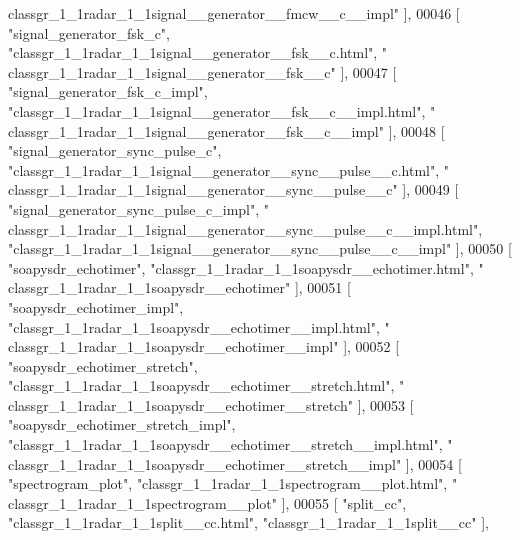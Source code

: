\begin{DoxyCode}
{      classgr\_1\_1radar\_1\_1signal\_\_generator\_\_fmcw\_\_c\_\_impl"} ],
00046     [ \textcolor{stringliteral}{"signal\_generator\_fsk\_c"}, \textcolor{stringliteral}{"classgr\_1\_1radar\_1\_1signal\_\_generator\_\_fsk\_\_c.html"}, \textcolor{stringliteral}{"
      classgr\_1\_1radar\_1\_1signal\_\_generator\_\_fsk\_\_c"} ],
00047     [ \textcolor{stringliteral}{"signal\_generator\_fsk\_c\_impl"}, \textcolor{stringliteral}{"classgr\_1\_1radar\_1\_1signal\_\_generator\_\_fsk\_\_c\_\_impl.html"}, \textcolor{stringliteral}{"
      classgr\_1\_1radar\_1\_1signal\_\_generator\_\_fsk\_\_c\_\_impl"} ],
00048     [ \textcolor{stringliteral}{"signal\_generator\_sync\_pulse\_c"}, \textcolor{stringliteral}{"classgr\_1\_1radar\_1\_1signal\_\_generator\_\_sync\_\_pulse\_\_c.html"}, \textcolor{stringliteral}{"
      classgr\_1\_1radar\_1\_1signal\_\_generator\_\_sync\_\_pulse\_\_c"} ],
00049     [ \textcolor{stringliteral}{"signal\_generator\_sync\_pulse\_c\_impl"}, \textcolor{stringliteral}{"
      classgr\_1\_1radar\_1\_1signal\_\_generator\_\_sync\_\_pulse\_\_c\_\_impl.html"}, \textcolor{stringliteral}{"classgr\_1\_1radar\_1\_1signal\_\_generator\_\_sync\_\_pulse\_\_c\_\_impl"} ],
00050     [ \textcolor{stringliteral}{"soapysdr\_echotimer"}, \textcolor{stringliteral}{"classgr\_1\_1radar\_1\_1soapysdr\_\_echotimer.html"}, \textcolor{stringliteral}{"
      classgr\_1\_1radar\_1\_1soapysdr\_\_echotimer"} ],
00051     [ \textcolor{stringliteral}{"soapysdr\_echotimer\_impl"}, \textcolor{stringliteral}{"classgr\_1\_1radar\_1\_1soapysdr\_\_echotimer\_\_impl.html"}, \textcolor{stringliteral}{"
      classgr\_1\_1radar\_1\_1soapysdr\_\_echotimer\_\_impl"} ],
00052     [ \textcolor{stringliteral}{"soapysdr\_echotimer\_stretch"}, \textcolor{stringliteral}{"classgr\_1\_1radar\_1\_1soapysdr\_\_echotimer\_\_stretch.html"}, \textcolor{stringliteral}{"
      classgr\_1\_1radar\_1\_1soapysdr\_\_echotimer\_\_stretch"} ],
00053     [ \textcolor{stringliteral}{"soapysdr\_echotimer\_stretch\_impl"}, \textcolor{stringliteral}{"classgr\_1\_1radar\_1\_1soapysdr\_\_echotimer\_\_stretch\_\_impl.html"}, \textcolor{stringliteral}{"
      classgr\_1\_1radar\_1\_1soapysdr\_\_echotimer\_\_stretch\_\_impl"} ],
00054     [ \textcolor{stringliteral}{"spectrogram\_plot"}, \textcolor{stringliteral}{"classgr\_1\_1radar\_1\_1spectrogram\_\_plot.html"}, \textcolor{stringliteral}{"
      classgr\_1\_1radar\_1\_1spectrogram\_\_plot"} ],
00055     [ \textcolor{stringliteral}{"split\_cc"}, \textcolor{stringliteral}{"classgr\_1\_1radar\_1\_1split\_\_cc.html"}, \textcolor{stringliteral}{"classgr\_1\_1radar\_1\_1split\_\_cc"} ],

\end{DoxyCode}
